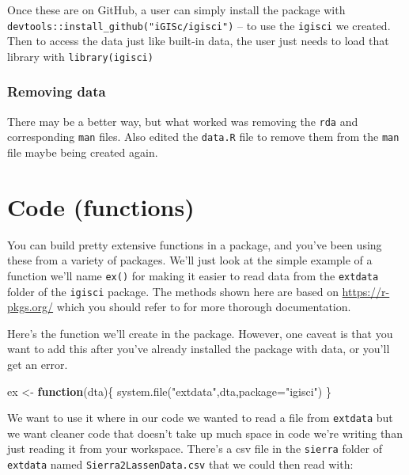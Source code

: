 \documentclass[
]{book}
\newenvironment{Shaded}{\begin{snugshade}}{\end{snugshade}}
\newcommand{\AttributeTok}[1]{\textcolor[rgb]{0.61,0.61,0.61}{#1}}
\newcommand{\ControlFlowTok}[1]{\textcolor[rgb]{0.27,0.27,0.27}{\textbf{#1}}}
\newcommand{\FunctionTok}[1]{\textcolor[rgb]{0,0,0}{#1}}
\newcommand{\NormalTok}[1]{#1}
\newcommand{\OtherTok}[1]{\textcolor[rgb]{0.37,0.37,0.37}{#1}}
\newcommand{\StringTok}[1]{\textcolor[rgb]{0.5,0.5,0.5}{#1}}
\begin{document}
Once these are on GitHub, a user can simply install the package with \texttt{devtools::install\_github("iGISc/igisci")} -- to use the \texttt{igisci} we created. Then to access the data just like built-in data, the user just needs to load that library with \texttt{library(igisci)}

\hypertarget{removing-data}{%
\subsubsection{Removing data}\label{removing-data}}

There may be a better way, but what worked was removing the \texttt{rda} and corresponding \texttt{man} files. Also edited the \texttt{data.R} file to remove them from the \texttt{man} file maybe being created again.

\hypertarget{code-functions}{%
\section*{Code (functions)}\label{code-functions}}


You can build pretty extensive functions in a package, and you've been using these from a variety of packages. We'll just look at the simple example of a function we'll name \texttt{ex()} for making it easier to read data from the \texttt{extdata} folder of the \texttt{igisci} package. The methods shown here are based on \url{https://r-pkgs.org/} which you should refer to for more thorough documentation.

Here's the function we'll create in the package. However, one caveat is that you want to add this after you've already installed the package with data, or you'll get an error.

\begin{Shaded}
\begin{Highlighting}[]
\NormalTok{ex }\OtherTok{\textless{}{-}} \ControlFlowTok{function}\NormalTok{(dta)\{}
  \FunctionTok{system.file}\NormalTok{(}\StringTok{"extdata"}\NormalTok{,dta,}\AttributeTok{package=}\StringTok{"igisci"}\NormalTok{)}
\NormalTok{  \}}
\end{Highlighting}
\end{Shaded}

We want to use it where in our code we wanted to read a file from \texttt{extdata} but we want cleaner code that doesn't take up much space in code we're writing than just reading it from your workspace. There's a csv file in the \texttt{sierra} folder of \texttt{extdata} named \texttt{Sierra2LassenData.csv} that we could then read with:
\end{document}

